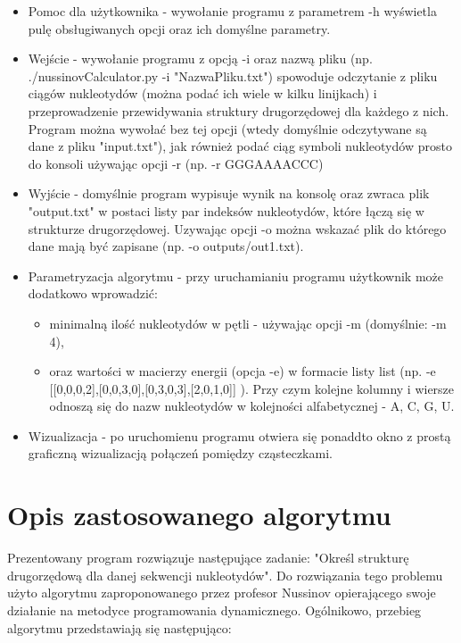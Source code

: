 \documentclass[paper=a4, fontsize=11pt]{scrartcl} %
\numberwithin{equation}{section} %
\numberwithin{figure}{section} %
\numberwithin{table}{section} %
\begin{document}
\begin{itemize}
	\item Pomoc dla użytkownika - wywołanie programu z parametrem -h wyświetla pulę obsługiwanych opcji oraz ich domyślne parametry.
	\item Wejście - wywołanie programu z opcją -i oraz nazwą pliku (np. ./nussinovCalculator.py -i "NazwaPliku.txt") spowoduje odczytanie z pliku ciągów nukleotydów (można podać ich wiele w kilku linijkach) i przeprowadzenie przewidywania struktury drugorzędowej dla każdego z nich. Program można wywołać bez tej opcji (wtedy domyślnie odczytywane są dane z pliku "input.txt"), jak również podać ciąg symboli nukleotydów prosto do konsoli używając opcji \mbox{-r} (np. \mbox{-r} GGGAAAACCC)
	\item Wyjście - domyślnie program wypisuje wynik na konsolę oraz zwraca plik "output.txt" w postaci listy par indeksów nukleotydów, które łączą się w strukturze drugorzędowej. Uzywając opcji -o można wskazać plik do którego dane mają być zapisane (np. -o outputs/out1.txt).
	\item Parametryzacja algorytmu - przy uruchamianiu programu użytkownik może dodatkowo wprowadzić:
		\begin{itemize}
			\item minimalną ilość nukleotydów w pętli - używając opcji \mbox{-m} (domyślnie: \mbox{-m} 4),
			\item oraz wartości w macierzy energii (opcja -e) w formacie listy list (np. \mbox{-e} [[0,0,0,2],[0,0,3,0],[0,3,0,3],[2,0,1,0]] ). Przy czym kolejne kolumny i wiersze odnoszą się do nazw nukleotydów w kolejności alfabetycznej - A, C, G, U.
		\end{itemize}
	
	\item Wizualizacja - po uruchomienu programu otwiera się ponaddto okno z prostą graficzną wizualizacją połączeń pomiędzy cząsteczkami.
	
	
	
	



\end{itemize}



\section{Opis zastosowanego algorytmu}

Prezentowany program rozwiązuje następujące zadanie: "Określ strukturę drugorzędową dla danej sekwencji nukleotydów". Do rozwiązania tego problemu użyto algorytmu zaproponowanego przez profesor Nussinov \cite{bib:nuss1}\cite{bib:nuss2} opierającego swoje działanie na metodyce programowania dynamicznego. Ogólnikowo, przebieg algorytmu przedstawiają się następująco:
\end{document}
